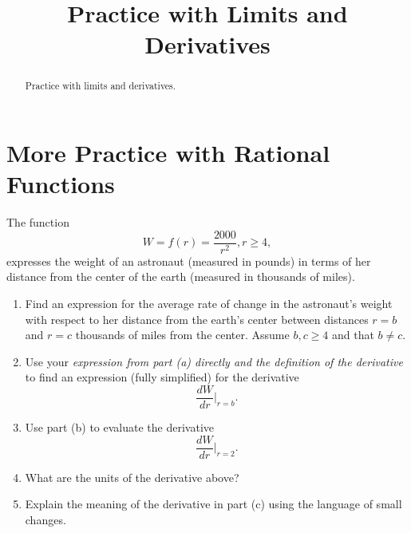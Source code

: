 \documentclass{ximera}
\title{Practice with Limits and Derivatives}
\begin{document}
\begin{abstract}
Practice with limits and derivatives.
\end{abstract}
\maketitle


\section{More Practice with Rational Functions}

\begin{question} \label{QPODFDgdfgfg}
The function
\[
        W = f(r) = \frac{2000}{r^2} , r\geq 4 ,
\]
expresses the weight of an astronaut (measured in pounds) in terms of her distance from the center of the earth (measured in thousands of miles).

\begin{enumerate}
\item  Find an expression for the average rate of change in the astronaut's weight with respect to her distance from the earth's center between distances $r=b$ and $r=c$ thousands of miles from the center. Assume $b,c\geq 4$ and that $b\neq c$.

\item Use your \emph{expression from part (a) directly and the definition of the derivative} to find an expression (fully simplified) for the derivative
\[
   \frac{dW}{dr}\Big|_{r=b} .
\]

\item Use part (b) to evaluate the derivative
\[
   \frac{dW}{dr}\Big|_{r=2} .
\]

\item What are the units of the derivative above?

\item Explain the meaning of the derivative in part (c) using the language of small changes.
\end{enumerate}

\end{question}
\end{document}
